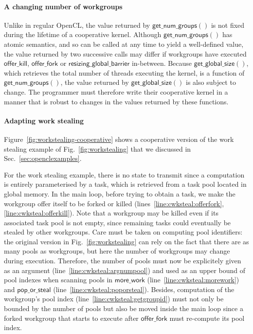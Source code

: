 \documentclass[numbers,nocopyrightspace,10pt]{sigplanconf}
\newcommand{\myfig}{Fig.~}
\newcommand{\myfiglong}{Figure~}
\newcommand{\mysec}{Sec.~}
\newcommand{\offerfork}{\mathsf{offer\_fork}}
\newcommand{\offerkill}{\mathsf{offer\_kill}}
\newcommand{\resizingglobalbarrier}{\mathsf{resizing\_global\_barrier}}
\newcommand{\getnumgroups}{\mathsf{get\_num\_groups}}
\newcommand{\getglobalsize}{\mathsf{get\_global\_size}}
\begin{document}
\paragraph{A changing number of workgroups}  Unlike in regular OpenCL,
the value returned by $\getnumgroups()$ is not fixed during the
lifetime of a cooperative kernel.  Although
$\getnumgroups()$ has atomic semantics, and so can be called at any
time to yield a well-defined value, the value returned by two
successive calls may differ if workgroups have executed $\offerkill$,
$\offerfork$ or $\resizingglobalbarrier$ in-between.  Because $\getglobalsize()$, which retrieves the total number of threads executing the kernel, is
a function of $\getnumgroups()$, the value returned by $\getglobalsize()$ is also subject to change.
The programmer
must therefore write their cooperative kernel in a manner that is
robust to changes in the values returned by these functions.

\paragraph{Adapting work stealing}

\myfiglong\ref{fig:workstealing-cooperative} shows a cooperative
version of the work stealing example of \myfig\ref{fig:workstealing} that we
discussed in \mysec\ref{sec:openclexamples}.

For the work stealing example, there is no state to transmit since a
computation is entirely parameterised by a task, which is retrieved from
a task pool located in global memory. In the main loop, before trying to
obtain a task, we make the workgroup offer itself to be forked or killed
(lines~\ref{line:cwksteal:offerfork},\ref{line:cwksteal:offerkill}). Note
that a workgroup may be killed even if its associated task pool is not
empty, since remaining tasks could eventually be stealed by other
workgroups.  Care must be taken on computing pool identifiers: the
original version in \myfig\ref{fig:workstealing} can rely on the fact
that there are as many pools as workgroups, but here the number of
workgroups may change during execution. Therefore, the number of pools
must now be explicitely given as an argument
(line~\ref{line:cwksteal:argnumpool}) and used as an upper bound of pool
indexes when scanning pools in $\mathsf{more\_work}$
(line~\ref{line:cwksteal:morework}) and $\mathsf{pop\_or\_steal}$
(line~\ref{line:cwksteal:poporsteal}). Besides, computation of the
workgroup's pool index (line~\ref{line:cwksteal:getgroupid}) must not
only be bounded by the number of pools but also be moved inside the main
loop since a forked workgroup that starts to execute after $\offerfork$
must re-compute its pool index.
\end{document}

